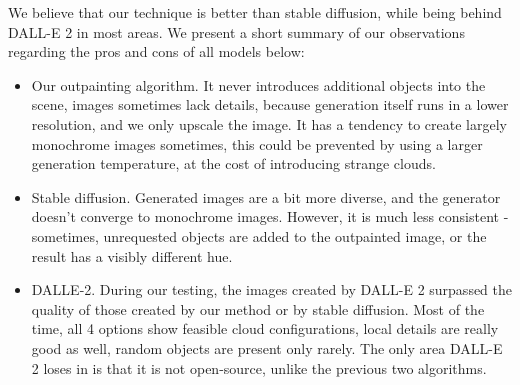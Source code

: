We believe that our technique is better than stable diffusion, while being behind DALL-E 2 in most areas. We present a short summary of our observations regarding the pros and cons of all models below:

\begin{itemize}
    \item Our outpainting algorithm. It never introduces additional objects into the scene, images sometimes lack details, because generation itself runs in a lower resolution, and we only upscale the image. It has a tendency to create largely monochrome images sometimes, this could be prevented by using a larger generation temperature, at the cost of introducing strange clouds.
    \item Stable diffusion. Generated images are a bit more diverse, and the generator doesn't converge to monochrome images. However, it is much less consistent - sometimes, unrequested objects are added to the outpainted image, or the result has a visibly different hue.
    \item DALLE-2. During our testing, the images created by DALL-E 2 surpassed the quality of those created by our method or by stable diffusion. Most of the time, all 4 options show feasible cloud configurations, local details are really good as well, random objects are present only rarely. The only area DALL-E 2 loses in is that it is not open-source, unlike the previous two algorithms.
\end{itemize}

